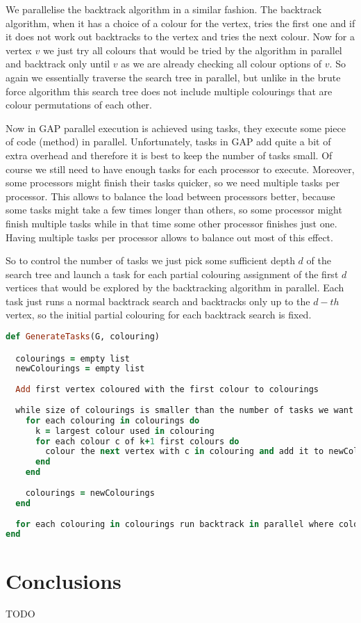 \documentclass{report}
\theoremstyle{plain}
\theoremstyle{definition}
\theoremstyle{remark}
\numberwithin{definition}{chapter}
\numberwithin{example}{chapter}
\numberwithin{figure}{chapter}
\numberwithin{theorem}{chapter}
\numberwithin{lemma}{chapter}
\begin{document}
We parallelise the backtrack algorithm in a similar fashion. The backtrack algorithm, when it has a choice of a colour for the vertex, tries the first one and if it does not work out backtracks to the vertex and tries the next colour. Now for a vertex $v$ we just try all colours that would be tried by the algorithm in parallel and backtrack only until $v$ as we are already checking all colour options of $v$. So again we essentially traverse the search tree in parallel, but unlike in the brute force algorithm this search tree does not include multiple colourings that are colour permutations of each other.

Now in GAP parallel execution is achieved using tasks, they execute some piece of code (method) in parallel. Unfortunately, tasks in GAP add quite a bit of extra overhead and therefore it is best to keep the number of tasks small. Of course we still need to have enough tasks for each processor to execute. Moreover, some processors might finish their tasks quicker, so we need multiple tasks per processor. This allows to balance the load between processors better, because some tasks might take a few times longer than others, so some processor might finish multiple tasks while in that time some other processor finishes just one. Having multiple tasks per processor allows to balance out most of this effect.

So to control the number of tasks we just pick some sufficient depth $d$ of the search tree and launch a task for each partial colouring assignment of the first $d$ vertices that would be explored by the backtracking algorithm in parallel. Each task just runs a normal backtrack search and backtracks only up to the $d-th$ vertex, so the initial partial colouring for each backtrack search is fixed.

\begin{lstlisting}[language=Ruby]
def GenerateTasks(G, colouring)

  colourings = empty list
  newColourings = empty list
  
  Add first vertex coloured with the first colour to colourings
  
  while size of colourings is smaller than the number of tasks we want do
    for each colouring in colourings do
      k = largest colour used in colouring
      for each colour c of k+1 first colours do
        colour the next vertex with c in colouring and add it to newColourings
      end
    end
    
    colourings = newColourings
  end
  
  for each colouring in colourings run backtrack in parallel where colouring is fixed
end
\end{lstlisting}

\chapter{Conclusions}

TODO



\end{document}
